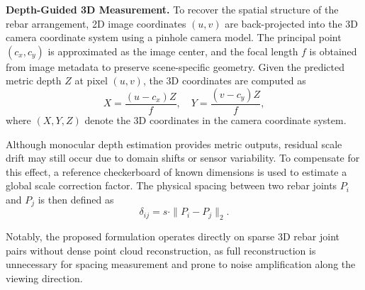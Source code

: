 \documentclass{article}
\begin{document}
\noindent \textbf{Depth-Guided 3D Measurement.}
To recover the spatial structure of the rebar arrangement, 2D image coordinates $(u,v)$ are back-projected into the 3D camera coordinate system using a pinhole camera model. The principal point $(c_x,c_y)$ is approximated as the image center, and the focal length $f$ is obtained from image metadata to preserve scene-specific geometry. Given the predicted metric depth $Z$ at pixel $(u,v)$, the 3D coordinates are computed as
{\setlength{\abovedisplayskip}{4pt}
 \setlength{\belowdisplayskip}{4pt}\[
X = \frac{(u - c_x) Z}{f}, \quad Y = \frac{(v - c_y) Z}{f},
\]
}
where $(X, Y, Z)$ denote the 3D coordinates in the camera coordinate system.

Although monocular depth estimation provides metric outputs, residual scale drift may still occur due to domain shifts or sensor variability. To compensate for this effect, a reference checkerboard of known dimensions is used to estimate a global scale correction factor. The physical spacing between two rebar joints $P_i$ and $P_j$ is then defined as
{\setlength{\abovedisplayskip}{4pt}
 \setlength{\belowdisplayskip}{4pt}
\[
\delta_{ij} = s \cdot \| P_i - P_j \|_2 .
\]
}

Notably, the proposed formulation operates directly on sparse 3D rebar joint pairs without dense point cloud reconstruction, as full reconstruction is unnecessary for spacing measurement and prone to noise amplification along the viewing direction.



\vspace{-0.3cm}
\end{document}
